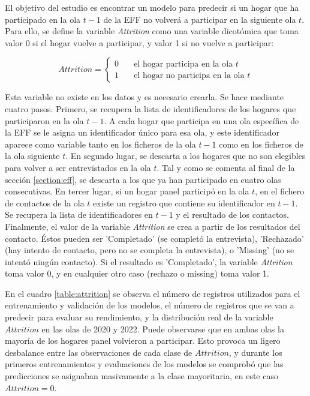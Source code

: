 El objetivo del estudio es encontrar un modelo para predecir si un hogar que ha participado en la ola $t-1$ de la EFF no volverá a participar en la siguiente ola $t$. Para ello, se define la variable \textit{Attrition} como una variable dicotómica que toma valor 0 si el hogar vuelve a participar, y valor 1 si no vuelve a participar:

\begin{equation}
Attrition =
  \begin{cases}
    0       & \quad \text{el hogar participa en la ola $t$} \\
    1  & \quad \text{el hogar no participa en la ola $t$}
  \end{cases}
\end{equation}

Esta variable no existe en los datos y es necesario crearla. Se hace mediante cuatro pasos. Primero, se recupera la lista de identificadores de los hogares que participaron en la ola $t-1$. A cada hogar que participa en una ola específica de la EFF se le asigna un identificador único para esa ola, y este identificador aparece como variable tanto en los ficheros de la ola $t-1$ como en los ficheros de la ola siguiente $t$. En segundo lugar, se descarta a los hogares que no son elegibles para volver a ser entrevistados en la ola $t$. Tal y como se comenta al final de la sección \ref{section:eff}, se descarta a los que ya han participado en cuatro olas consecutivas. En tercer lugar, si un hogar panel participó en la ola $t$, en el fichero de contactos de la ola $t$ existe un registro que contiene su identificador en $t-1$. Se recupera la lista de identificadores en $t-1$ y el resultado de los contactos. Finalmente, el valor de la variable \textit{Attrition} se crea a partir de los resultados del contacto. Éstos pueden ser 'Completado' (se completó la entrevista), 'Rechazado' (hay intento de contacto, pero no se completa la entrevista), o 'Missing' (no se intentó ningún contacto). Si el resultado es 'Completado', la variable \textit{Attrition} toma valor 0, y en cualquier otro caso (rechazo o missing) toma valor 1.

En el cuadro \ref{table:attrition} se observa el número de registros utilizados para el entrenamiento y validación de los modelos, el número de registros que se van a predecir para evaluar su rendimiento, y la distribución real de la variable $Attrition$ en las olas de 2020 y 2022. Puede observarse que en ambas olas la mayoría de los hogares panel volvieron a participar. Esto provoca un ligero desbalance entre las observaciones de cada clase de $Attrition$, y durante los primeros entrenamientos y evaluaciones de los modelos se comprobó que las predicciones se asignaban masivamente a la clase mayoritaria, en este caso $Attrition=0$.


